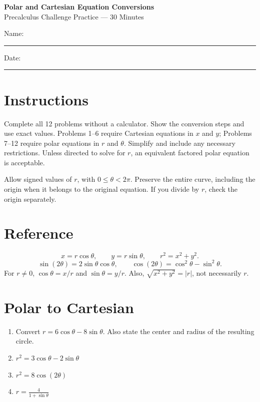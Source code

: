 \documentclass[12pt]{article}
\begin{document}
\begin{center}
  {\Large\textbf{Polar and Cartesian Equation Conversions}}\\[3pt]
  {\large Precalculus Challenge Practice --- 30 Minutes}
\end{center}

Name: \rule{2.7in}{0.4pt}\hfill Date: \rule{1.5in}{0.4pt}

\section*{Instructions}
Complete all 12 problems without a calculator. Show the conversion steps and
use exact values. Problems 1--6 require Cartesian equations in $x$ and $y$;
Problems 7--12 require polar equations in $r$ and $\theta$.
Simplify and include any necessary restrictions. Unless directed to solve for
$r$, an equivalent factored polar equation is acceptable.

Allow signed values of $r$, with $0\le\theta<2\pi$.
Preserve the entire curve, including the origin when it belongs to the
original equation. If you divide by $r$, check the origin separately.

\section*{Reference}
\[
  x=r\cos\theta,\qquad y=r\sin\theta,\qquad r^2=x^2+y^2.
\]
\[
  \sin(2\theta)=2\sin\theta\cos\theta,\qquad
  \cos(2\theta)=\cos^2\theta-\sin^2\theta.
\]
For $r\ne0$, $\cos\theta=x/r$ and $\sin\theta=y/r$.
Also, $\sqrt{x^2+y^2}=|r|$, not necessarily $r$.

\section*{Polar to Cartesian}
\begin{enumerate}[leftmargin=*,itemsep=0pt]
  \item Convert $r=6\cos\theta-8\sin\theta$.
  Also state the center and radius of the resulting circle.
  \par{}

  \item $r^2=3\cos\theta-2\sin\theta$
  \par{}

  \item $r^2=8\cos(2\theta)$
  \par{}

  \item $\displaystyle r=\frac{4}{1+\sin\theta}$
  \par{}
\end{enumerate}
\end{document}
